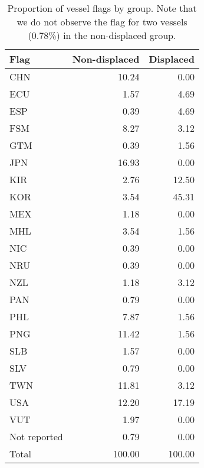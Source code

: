 \begin{table}[t]

\caption{\label{tab:}Proportion of vessel flags by group. Note that we do not observe the flag for two vessels (0.78\%) in the non-displaced group.}
\centering
\begin{tabular}{l|r|r}
\hline
Flag & Non-displaced & Displaced\\
\hline
CHN & 10.24 & 0.00\\
\hline
ECU & 1.57 & 4.69\\
\hline
ESP & 0.39 & 4.69\\
\hline
FSM & 8.27 & 3.12\\
\hline
GTM & 0.39 & 1.56\\
\hline
JPN & 16.93 & 0.00\\
\hline
KIR & 2.76 & 12.50\\
\hline
KOR & 3.54 & 45.31\\
\hline
MEX & 1.18 & 0.00\\
\hline
MHL & 3.54 & 1.56\\
\hline
NIC & 0.39 & 0.00\\
\hline
NRU & 0.39 & 0.00\\
\hline
NZL & 1.18 & 3.12\\
\hline
PAN & 0.79 & 0.00\\
\hline
PHL & 7.87 & 1.56\\
\hline
PNG & 11.42 & 1.56\\
\hline
SLB & 1.57 & 0.00\\
\hline
SLV & 0.79 & 0.00\\
\hline
TWN & 11.81 & 3.12\\
\hline
USA & 12.20 & 17.19\\
\hline
VUT & 1.97 & 0.00\\
\hline
Not reported & 0.79 & 0.00\\
\hline
Total & 100.00 & 100.00\\
\hline
\end{tabular}
\end{table}